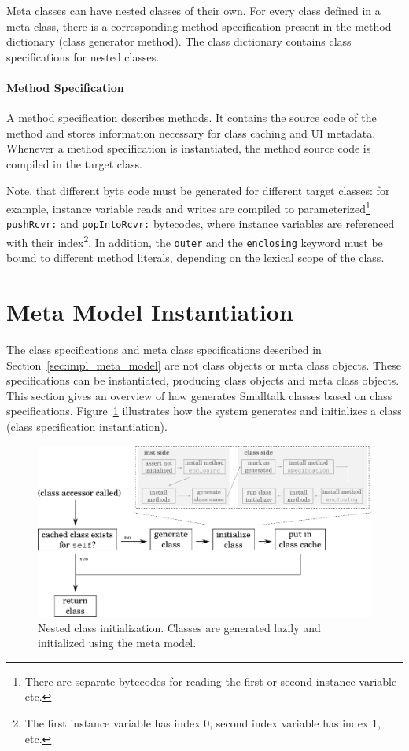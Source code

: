 Meta classes can have nested classes of their own. For every class defined in a meta class, there is a corresponding method specification present in the method dictionary (class generator method). The class dictionary contains class specifications for nested classes.

\paragraph{Method Specification}
A method specification describes methods. It contains the source code of the method and stores information necessary for class caching and UI metadata. Whenever a method specification is instantiated, the method source code is compiled in the target class. 

Note, that different byte code must be generated for different target classes: for example, instance variable reads and writes are compiled to parameterized\footnote{There are separate bytecodes for reading the first or second instance variable etc.} \texttt{pushRcvr:} and \texttt{popIntoRcvr:} bytecodes, where instance variables are referenced with their index\footnote{The first instance variable has index 0, second index variable has index 1, etc.}. In addition, the \texttt{outer} and the \texttt{enclosing} keyword must be bound to different method literals, depending on the lexical scope of the class.

\section{Meta Model Instantiation}
The class specifications and meta class specifications described in Section~\ref{sec:impl_meta_model} are not class objects or meta class objects. These specifications can be instantiated, producing class objects and meta class objects. This section gives an overview of how \msname generates Smalltalk classes based on class specifications. Figure~\ref{fig:lazy_class_gen} illustrates how the system generates and initializes a class (class specification instantiation). 

\begin{figure}
	\includegraphics[width=\textwidth]{lazy_class_gen.pdf}
	\centering
	\caption[Nested class initialization]{Nested class initialization. Classes are generated lazily and initialized using the \msname meta model.}
	\label{fig:lazy_class_gen}
\end{figure}

